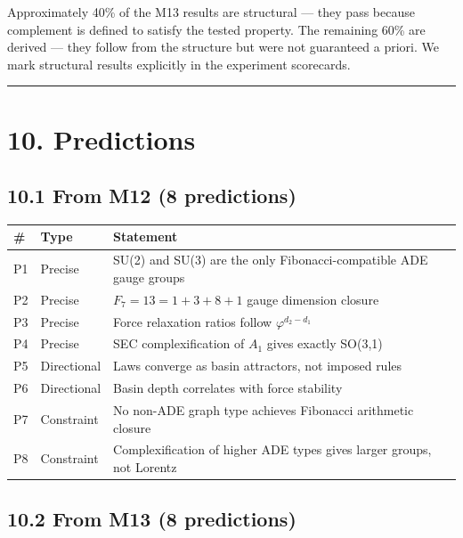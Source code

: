 \documentclass[11pt,a4paper]{article}
\begin{document}
Approximately 40\% of the M13 results are structural — they pass because complement is defined to satisfy the tested property. The remaining 60\% are derived — they follow from the structure but were not guaranteed a priori. We mark structural results explicitly in the experiment scorecards.

\begin{center}\rule{0.5\linewidth}{0.4pt}\end{center}

\section*{10. Predictions}

\subsection*{10.1 From M12 (8 predictions)}

\begin{longtable}[]{@{}lll@{}}
\toprule
\# & Type & Statement \\
\midrule\endhead
P1 & Precise & SU(2) and SU(3) are the only Fibonacci-compatible ADE gauge groups \\
P2 & Precise & $F_7 = 13 = 1 + 3 + 8 + 1$ gauge dimension closure \\
P3 & Precise & Force relaxation ratios follow $\varphi^{d_2 - d_1}$ \\
P4 & Precise & SEC complexification of $A_1$ gives exactly SO(3,1) \\
P5 & Directional & Laws converge as basin attractors, not imposed rules \\
P6 & Directional & Basin depth correlates with force stability \\
P7 & Constraint & No non-ADE graph type achieves Fibonacci arithmetic closure \\
P8 & Constraint & Complexification of higher ADE types gives larger groups, not Lorentz \\
\bottomrule
\end{longtable}

\subsection*{10.2 From M13 (8 predictions)}
\end{document}
